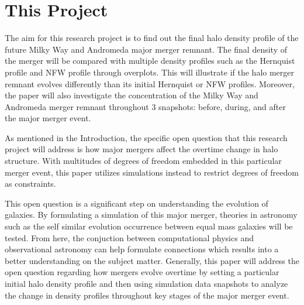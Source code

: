 \documentclass[twocolumn]{aastex63}
\begin{document}
\section{This Project}
The aim for this research project is to find out the final halo density profile of the future Milky Way and Andromeda major merger remnant. The final density of the merger will be compared with multiple density profiles such as the Hernquist profile and NFW profile through overplots. This will illustrate if the halo merger remnant evolves differently than its initial Hernquist or NFW profiles. Moreover, the paper will also investigate the concentration of the Milky Way and Andromeda merger remnant throughout 3 snapshots: before, during, and after the major merger event. \par 
As mentioned in the Introduction, the specific open question that this research project will address is how major mergers affect the overtime change in halo structure. With multitudes of degrees of freedom embedded in this particular merger event, this paper utilizes simulations instead to restrict degrees of freedom as constraints. \par
This open question is a significant step on understanding the evolution of galaxies. By formulating a simulation of this major merger, theories in astronomy such as the self similar evolution occurrence between equal mass galaxies will be tested. From here, the conjuction  between computational physics and observational astronomy can help formulate connections which results into a better understanding on the subject matter. Generally, this paper will address the open question regarding how mergers evolve overtime by setting a particular initial halo density profile and then using simulation data snapshots to analyze the change in density profiles throughout key stages of the major merger event. \par
\end{document}
